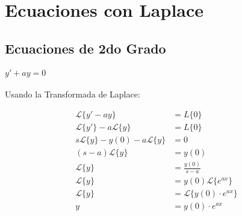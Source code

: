 \documentclass[12pt]{report}                                    %
\begin{document}
\chapter{Ecuaciones con Laplace}


    \clearpage
    \section{Ecuaciones de 2do Grado}

        \subsubsection{$y'+ay=0$}
            Usando la Transformada de Laplace:

            \begin{equation*}   
            \begin{split}
                \mathscr{L}\{ y'-ay \} &= L\{0\}                            \\
                \mathscr{L}\{y'\}-a\mathscr{L}\{y\} &= L\{0\}               \\
                s\mathscr{L}\{y\}-y(0)-a\mathscr{L}\{y\} &= 0               \\
                (s-a)\mathscr{L}\{y\} &= y(0)                               \\
                \mathscr{L}\{y\} &= \frac{y(0)}{s-a}                        \\
                \mathscr{L}\{y\} &= y(0) \mathscr{L}\{e^{ax}\}              \\
                \mathscr{L}\{y\} &= \mathscr{L}\{y(0) \cdot e^{ax}\}        \\
                y &= y(0) \cdot e^{ax}                                      \\
            \end{split}
            \end{equation*}


\end{document}
